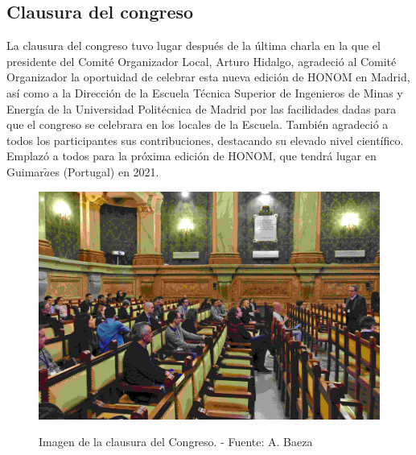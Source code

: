 \documentclass[twoside]{article}
\begin{document}
\subsection{Clausura del congreso}
La clausura del congreso tuvo lugar después de la última charla en la que el presidente del Comité Organizador Local, Arturo Hidalgo, agradeció al Comité Organizador la oportuidad de celebrar esta nueva edición de HONOM en Madrid, así como a la Dirección de la Escuela Técnica Superior de Ingenieros de Minas y Energía de la Universidad Politécnica de Madrid por las facilidades dadas para que el congreso se celebrara en los locales de la Escuela. También agradeció a todos los participantes sus contribuciones, destacando su elevado nivel científico. Emplazó a todos para la próxima edición de HONOM, que tendrá lugar en Guimar$\tilde{a}$es (Portugal) en 2021.
\begin{center}
\begin{figure}
	\centering
		\includegraphics[width=.95\textwidth]{Clausura}
	\label{fig:Claus}
	\caption{Imagen de la clausura del Congreso. - Fuente: A. Baeza}
\end{figure}
\end{center}
\end{document}

